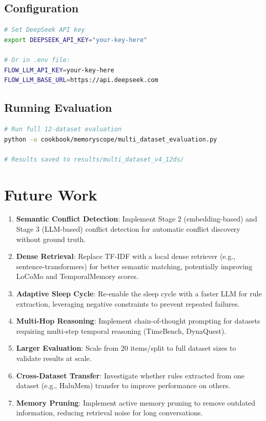 \documentclass[11pt,a4paper]{article}
\begin{document}
\subsection{Configuration}

\begin{lstlisting}[language=bash,frame=single]
# Set DeepSeek API key
export DEEPSEEK_API_KEY="your-key-here"

# Or in .env file:
FLOW_LLM_API_KEY=your-key-here
FLOW_LLM_BASE_URL=https://api.deepseek.com
\end{lstlisting}

\subsection{Running Evaluation}

\begin{lstlisting}[language=bash,frame=single]
# Run full 12-dataset evaluation
python -u cookbook/memoryscope/multi_dataset_evaluation.py

# Results saved to results/multi_dataset_v4_12ds/
\end{lstlisting}

\section{Future Work}

\begin{enumerate}
    \item \textbf{Semantic Conflict Detection}: Implement Stage 2 (embedding-based) and Stage 3 (LLM-based) conflict detection for automatic conflict discovery without ground truth.
    
    \item \textbf{Dense Retrieval}: Replace TF-IDF with a local dense retriever (e.g., sentence-transformers) for better semantic matching, potentially improving LoCoMo and TemporalMemory scores.
    
    \item \textbf{Adaptive Sleep Cycle}: Re-enable the sleep cycle with a faster LLM for rule extraction, leveraging negative constraints to prevent repeated failures.
    
    \item \textbf{Multi-Hop Reasoning}: Implement chain-of-thought prompting for datasets requiring multi-step temporal reasoning (TimeBench, DynaQuest).
    
    \item \textbf{Larger Evaluation}: Scale from 20 items/split to full dataset sizes to validate results at scale.
    
    \item \textbf{Cross-Dataset Transfer}: Investigate whether rules extracted from one dataset (e.g., HaluMem) transfer to improve performance on others.
    
    \item \textbf{Memory Pruning}: Implement active memory pruning to remove outdated information, reducing retrieval noise for long conversations.
\end{enumerate}
\end{document}
